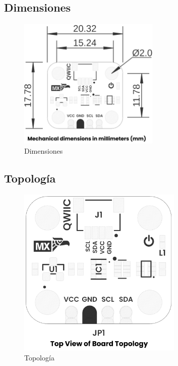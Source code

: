 \documentclass[11pt,a4paper]{article}
\begin{document}
\subsection{Dimensiones}


\begin{figure}[H]
\centering
\includegraphics[width=0.6\textwidth]{es_unit_dimension_v_1_0_0_icp10111_barometric_pressure_sensor.png}
\caption{Dimensiones}
\label{fig:es-unit-dimension-v-1-0-0-icp10111-barometric-pressure-sensor-png}
\end{figure}



\subsection{Topología}


\begin{figure}[H]
\centering
\includegraphics[width=0.7\textwidth]{es_unit_topology_v_1_0_0_icp10111_barometric_pressure_sensor.png}
\caption{Topología}
\label{fig:es-unit-topology-v-1-0-0-icp10111-barometric-pressure-sensor-png}
\end{figure}
\end{document}
